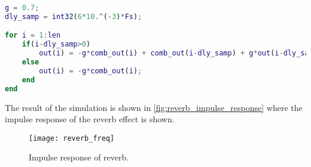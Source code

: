 \begin{lstlisting}[caption={Simulation of the all-pass filter.},language=MATLAB,label={code:sim_reverb_allpass},tabsize=2]
%allpass
g = 0.7;
dly_samp = int32(6*10.^(-3)*Fs);

for i = 1:len
    if(i-dly_samp>0)
        out(i) = -g*comb_out(i) + comb_out(i-dly_samp) + g*out(i-dly_samp);
    else
        out(i) = -g*comb_out(i);
    end
end
\end{lstlisting}

The result of the simulation is shown in \autoref{fig:reverb_impulse_response} where the impulse response of the reverb effect is shown. 

\begin{figure}[htbp]
    \centering
    \texttt{[image: reverb\_freq]}
    \caption{Impulse response of reverb.}
    \label{fig:reverb_impulse_response}
\end{figure}

